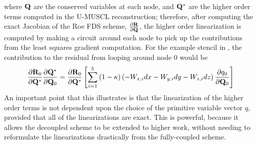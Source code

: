 where $\mathbf Q$ are the conserved variables at each node, and $\mathbf Q^*$ are the higher
order terms computed in the U-MUSCL reconstruction; therefore, after computing
the exact Jacobian of the Roe FDS scheme, $\frac{\partial \mathbf R}{\partial \mathbf Q}$, the higher order
linearization is computed by making a circuit around each node to pick up the
contributions from the least squares gradient computation.  For the example
stencil in , the contribution to the residual from
looping around node 0 would be
\begin{equation}
  \frac{\partial \mathbf R_0}{\partial \mathbf Q^*}\frac{\partial \mathbf Q^*}{\partial \mathbf Q_0} = \frac{\partial \mathbf R_0}{\partial \mathbf Q^*} \left[\sum_{i=1}^5{(1-\kappa)
  \left( -W_{x,i}dx - W_{y,i}dy - W_{z,i}dz \right) \frac{\partial q_0}{\partial \mathbf Q_0}}\right]
  \label{ho-linearization}
\end{equation}
An important point that this illustrates is that the linearization of the higher
order terms is not dependent upon the choice of the primitive variable vector
$q$, provided that all of the linearizations are exact.  This is powerful,
because it allows the decoupled scheme to be extended to higher work, without
needing to reformulate the linearizations drastically from the fully-coupled
scheme.
